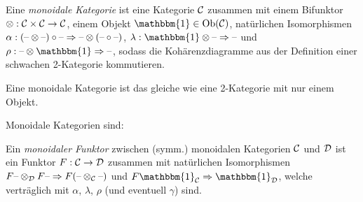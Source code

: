 \documentclass{cheat-sheet}
\newcommand{\LonelyHeart}{\{ \, \heartsuit \, \}} %
\newcommand{\UnitOb}{\mathbbm{1}} %
\newenvironment{centertikzcd}
  {\begin{center}\begin{tikzcd}}
  {\end{tikzcd}\end{center}}
\begin{document}
\begin{defn}
  Eine \emph{monoidale Kategorie} ist eine Kategorie $\mathcal{C}$ zusammen mit einem Bifunktor $\otimes : \mathcal{C} \times \mathcal{C} \to \mathcal{C}$, einem Objekt $\UnitOb \in \Ob(\Cat)$, natürlichen Isomorphismen $\alpha : (\text{--} \otimes \text{--}) \circ \text{--} \Rightarrow \text{--} \otimes (\text{--} \circ \text{--})$, $\lambda : \UnitOb \otimes \blank \Rightarrow \blank$ und $\rho : \blank \otimes \UnitOb \Rightarrow \blank$, sodass die Kohärenzdiagramme aus der Definition einer schwachen 2-Kategorie kommutieren.
\end{defn}

\begin{bem}
  Eine monoidale Kategorie ist das gleiche wie eine 2-Kategorie mit nur einem Objekt.
\end{bem}

\begin{bspe}
  Monoidale Kategorien sind: \quad
  \inlineitem{$(\SetC, \times, \LonelyHeart)$} \\
\end{bspe}



\begin{defn}
  Ein \emph{monoidaler Funktor} zwischen (symm.) monoidalen Kategorien $\mathcal{C}$ und $\mathcal{D}$ ist ein Funktor $F : \mathcal{C} \to \mathcal{D}$ zusammen mit natürlichen Isomorphismen $F \text{--} \otimes_{\mathcal{D}} F \text{--} \Rightarrow F (\text{--} \otimes_{\mathcal{C}} \text{--})$ und $F \UnitOb_\Cat \Rightarrow \UnitOb_\Dat$, welche verträglich mit $\alpha$, $\lambda$, $\rho$ (und eventuell $\gamma$) sind.
\end{defn}
\end{document}
